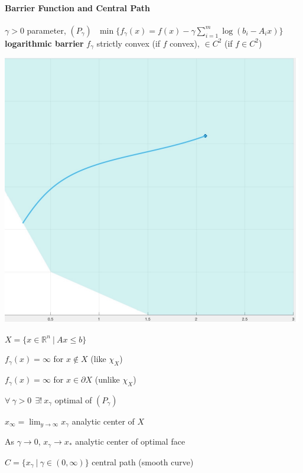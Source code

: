 \documentclass[10pt]{report}
\begin{document}
\paragraph{Barrier Function and Central Path} $\gamma > 0$ parameter, $(P_\gamma)\:\:\:\min\{f_\gamma(x) = f(x) - \gamma\sum_{i=1}^m \log(b_i-A_i x)\}$ \textbf{logarithmic barrier} $f_\gamma$ strictly convex (if $f$ convex), $\in C^2$ (if $f\in C^2$)
\begin{multicols}{2}
\begin{center}
	\includegraphics[scale=0.6]{15.png}
\end{center}
\begin{list}{}{}
	\item $X=\{x\in \mathbb{R}^n\:|\:Ax\leq b\}$
	\item $f_\gamma(x)=  \infty$ for $x\not\in X$ (like $\chi_X$)
	\item $f_\gamma(x)=  \infty$ for $x\in \partial X$ (unlike $\chi_X$)
	\item $\forall\:\gamma>0\:\:\exists!\:x_\gamma$ optimal of $(P_\gamma)$
	\item $x_\infty = \lim_{y\to\infty} x_\gamma$ analytic center of $X$
	\item As $\gamma \rightarrow 0$, $x_\gamma\rightarrow x_*$ analytic center of optimal face
	\item $C = \{x_\gamma\:|\:\gamma\in(0,\infty)\}$ central path (smooth curve)
\end{list}
\end{multicols}
\end{document}
